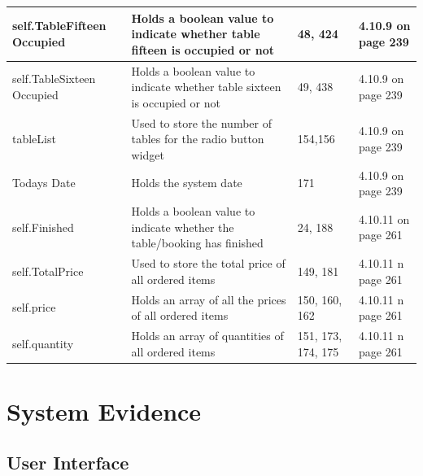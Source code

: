 \begin{center}
\begin{longtable}{|p{3cm}|p{4.5cm}|p{3cm}|p{1cm}|}
     self.TableFifteen Occupied &Holds a boolean value to indicate whether table fifteen is occupied or not &48, 424 &4.10.9 on page 239 \\ \hline
     self.TableSixteen Occupied &Holds a boolean value to indicate whether table sixteen is occupied or not &49, 438 &4.10.9 on page 239 \\ \hline
tableList & Used to store the number of tables for the radio button widget & 154,156 &4.10.9 on page 239 \\ \hline
Todays Date & Holds the system date & 171 &4.10.9  on page 239 \\ \hline
self.Finished & Holds a boolean value to indicate whether the table/booking has finished &24, 188 & 4.10.11 on page 261 \\ \hline
self.TotalPrice & Used to store the total price of all ordered items& 149, 181 &4.10.11 n page 261 \\ \hline
self.price & Holds an array of all the prices of all ordered items&150, 160, 162 &4.10.11 n page 261 \\ \hline
self.quantity & Holds an array of quantities of all ordered items & 151, 173, 174, 175 & 4.10.11 n page 261\\ \hline



\end{longtable}
\end{center}

\section{System Evidence}

\subsection{User Interface}

